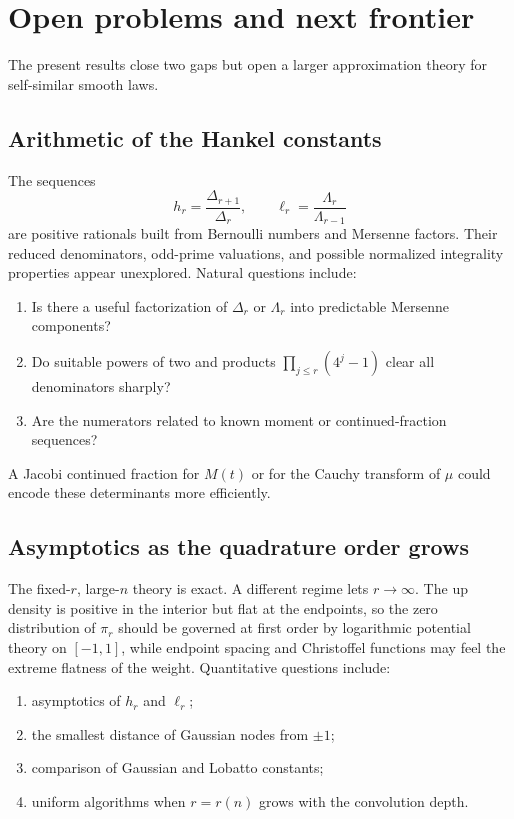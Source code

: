 \documentclass[11pt]{article}
\numberwithin{equation}{section}
\theoremstyle{definition}
\theoremstyle{remark}
\begin{document}
\section{Open problems and next frontier}
\label{p1:sec:open}

The present results close two gaps but open a larger approximation theory for self-similar smooth laws.

\subsection{Arithmetic of the Hankel constants}

The sequences
\begin{equation}
 h_r=\frac{\Delta_{r+1}}{\Delta_r},
 \qquad
 \ell_r=\frac{\Lambda_r}{\Lambda_{r-1}}
 \label{p1:eq:two-constant-sequences}
\end{equation}
are positive rationals built from Bernoulli numbers and Mersenne factors.  Their reduced denominators, odd-prime valuations, and possible normalized integrality properties appear unexplored.  Natural questions include:
\begin{enumerate}
\item Is there a useful factorization of $\Delta_r$ or $\Lambda_r$ into predictable Mersenne components?
\item Do suitable powers of two and products $\prod_{j\le r}(4^j-1)$ clear all denominators sharply?
\item Are the numerators related to known moment or continued-fraction sequences?
\end{enumerate}
A Jacobi continued fraction for $M(t)$ or for the Cauchy transform of $\mu$ could encode these determinants more efficiently.

\subsection{Asymptotics as the quadrature order grows}

The fixed-$r$, large-$n$ theory is exact.  A different regime lets $r\to\infty$.  The up density is positive in the interior but flat at the endpoints, so the zero distribution of $\pi_r$ should be governed at first order by logarithmic potential theory on $[-1,1]$, while endpoint spacing and Christoffel functions may feel the extreme flatness of the weight.  Quantitative questions include:
\begin{enumerate}
\item asymptotics of $h_r$ and $\ell_r$;
\item the smallest distance of Gaussian nodes from $\pm1$;
\item comparison of Gaussian and Lobatto constants;
\item uniform algorithms when $r=r(n)$ grows with the convolution depth.
\end{enumerate}
\end{document}
